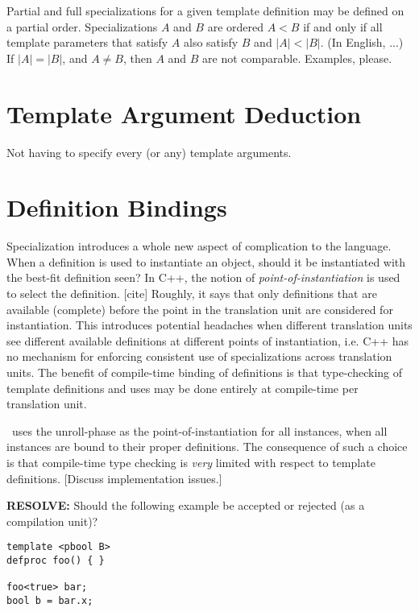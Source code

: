 Partial and full specializations for a given template definition
may be defined on a partial order.  
Specializations $A$ and $B$ are ordered $A < B$ if and only if
all template parameters that satisfy $A$ also satisfy $B$ and $|A| < |B|$.  
(In English, ...)
If $|A| = |B|$, and $A \neq B$, then $A$ and $B$ are not comparable.  
Examples, please.  

\section{Template Argument Deduction}
\label{sec:templates:deduction}

Not having to specify every (or any) template arguments.

\section{Definition Bindings}
\label{sec:templates:bind}

Specialization introduces a whole new aspect of complication to the language.  
When a definition is used to instantiate an object, should it be 
instantiated with the best-fit definition seen?  
In C++, the notion of \emph{point-of-instantiation} is used to 
select the definition.  [cite]
Roughly, it says that only definitions that are available (complete)
before the point in the translation unit are considered for instantiation.  
This introduces potential headaches when different translation units
see different available definitions at different points of instantiation, 
i.e. C++ has no mechanism for enforcing consistent use of specializations
across translation units.  
The benefit of compile-time binding of definitions is that type-checking
of template definitions and uses may be done entirely at compile-time
per translation unit.  

\artxx\ uses the unroll-phase as the point-of-instantiation for all 
instances, when all instances are bound to their proper definitions.  
The consequence of such a choice is that compile-time type checking
is \emph{very} limited with respect to template definitions.  
[Discuss implementation issues.]

\textbf{RESOLVE:}
Should the following example be accepted or rejected (as a compilation unit)?

\begin{verbatim}
template <pbool B>
defproc foo() { }

foo<true> bar;
bool b = bar.x;
\end{verbatim}

